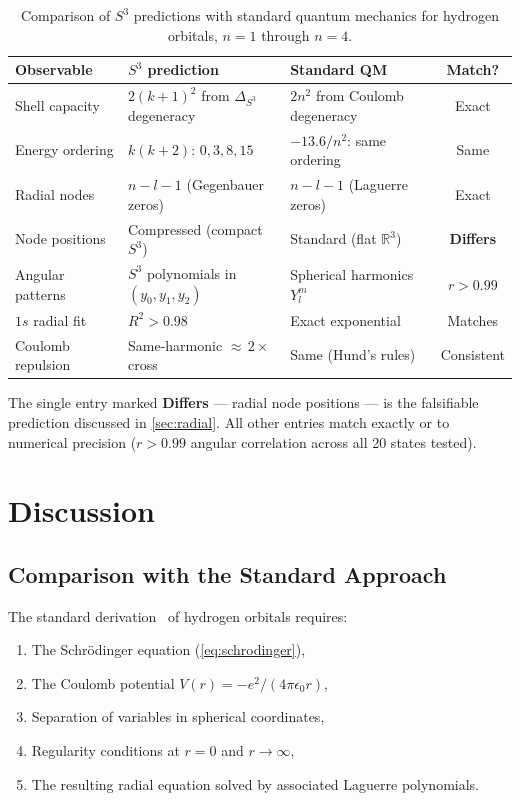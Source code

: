 \documentclass[12pt, a4paper]{article}
\theoremstyle{definition}
\theoremstyle{remark}
\newcommand{\Sthree}{S^3}
\newcommand{\R}{\mathbb{R}}
\newcommand{\lap}{\Delta_{\Sthree}}
\begin{document}
\begin{table}[h!]
\centering
\caption{Comparison of $\Sthree$ predictions with standard quantum mechanics
  for hydrogen orbitals, $n = 1$ through $n = 4$.}
\label{tab:comparison}
\renewcommand{\arraystretch}{1.3}
\begin{tabular}{@{}p{3.2cm}p{3.8cm}p{3.5cm}c@{}}
\toprule
Observable & $\Sthree$ prediction & Standard QM & Match? \\
\midrule
Shell capacity &
  $2(k{+}1)^2$ from $\lap$ degeneracy &
  $2n^2$ from Coulomb degeneracy &
  Exact \\
Energy ordering &
  $k(k{+}2)$: $0, 3, 8, 15$ &
  $-13.6/n^2$: same ordering &
  Same \\
Radial nodes &
  $n{-}l{-}1$ (Gegenbauer zeros) &
  $n{-}l{-}1$ (Laguerre zeros) &
  Exact \\
Node positions &
  Compressed (compact $\Sthree$) &
  Standard (flat $\R^3$) &
  \textbf{Differs} \\
Angular patterns &
  $\Sthree$ polynomials in $(y_0, y_1, y_2)$ &
  Spherical harmonics $Y_l^m$ &
  $r > 0.99$ \\
$1s$ radial fit &
  $R^2 > 0.98$ &
  Exact exponential &
  Matches \\
Coulomb repulsion &
  Same-harmonic ${\approx}\,2\times$ cross &
  Same (Hund's rules) &
  Consistent \\
\bottomrule
\end{tabular}
\end{table}

The single entry marked \textbf{Differs} --- radial node positions --- is
the falsifiable prediction discussed in \cref{sec:radial}. All other entries
match exactly or to numerical precision ($r > 0.99$ angular correlation
across all 20 states tested).


\section{Discussion}
\label{sec:discussion}

\subsection{Comparison with the Standard Approach}

The standard derivation~\cite{griffiths2018} of hydrogen orbitals requires:
\begin{enumerate}[nosep]
  \item The Schr\"odinger equation (\cref{eq:schrodinger}),
  \item The Coulomb potential $V(r) = -e^2/(4\pi\epsilon_0 r)$,
  \item Separation of variables in spherical coordinates,
  \item Regularity conditions at $r = 0$ and $r \to \infty$,
  \item The resulting radial equation solved by associated Laguerre
    polynomials.
\end{enumerate}
\end{document}
